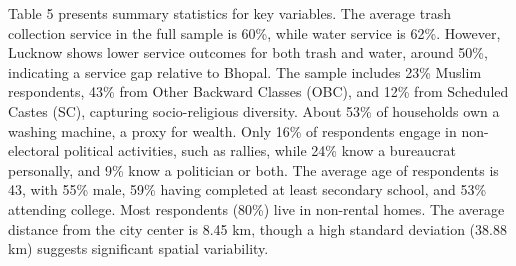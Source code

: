 Table 5 presents summary statistics for key variables. The average trash collection service in the full sample is 60\%, while water service is 62\%. However, Lucknow shows lower service outcomes for both trash and water, around 50\%, indicating a service gap relative to Bhopal. The sample includes 23\% Muslim respondents, 43\% from Other Backward Classes (OBC), and 12\% from Scheduled Castes (SC), capturing socio-religious diversity. About 53\% of households own a washing machine, a proxy for wealth. Only 16\% of respondents engage in non-electoral political activities, such as rallies, while 24\% know a bureaucrat personally, and 9\% know a politician or both. The average age of respondents is 43, with 55\% male, 59\% having completed at least secondary school, and 53\% attending college. Most respondents (80\%) live in non-rental homes. The average distance from the city center is 8.45 km, though a high standard deviation (38.88 km) suggests significant spatial variability.



